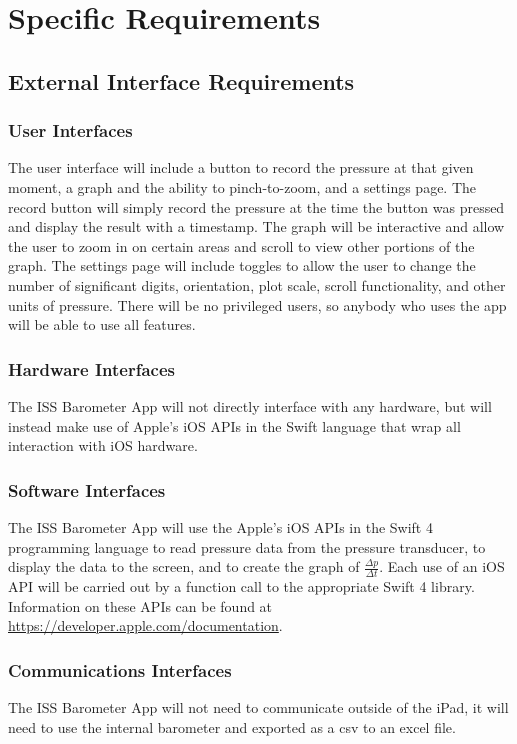 \documentclass[onecolumn, draftclsnofoot,10pt, compsoc]{IEEEtran}
\def \CapstoneProjectName{ISS Barometer App }
\begin{document}
\section{Specific Requirements}

\subsection{External Interface Requirements}

\subsubsection{User Interfaces}
The user interface will include a button to record the pressure at that given moment, a graph and the ability to pinch-to-zoom, and a settings page.
The record button will simply record the pressure at the time the button was pressed and display the result with a timestamp.
The graph will be interactive and allow the user to zoom in on certain areas and scroll to view other portions of the graph.
The settings page will include toggles to allow the user to change the number of significant digits, orientation, plot scale, scroll functionality, and other units of pressure.
There will be no privileged users, so anybody who uses the app will be able to use all features.

\subsubsection{Hardware Interfaces}
The \CapstoneProjectName will not directly interface with any hardware, but will instead make use of Apple's iOS APIs in the Swift language that wrap all interaction with iOS hardware.

\subsubsection{Software Interfaces}
The \CapstoneProjectName will use the Apple's iOS APIs in the Swift 4 programming language to read pressure data from the pressure transducer, to display the data to the screen, and to create the graph of $\frac{\Delta p}{\Delta t}$.
Each use of an iOS API will be carried out by a function call to the appropriate Swift 4 library. Information on these APIs can be found at \url{https://developer.apple.com/documentation}.

\subsubsection{Communications Interfaces}
The ISS Barometer App will not need to communicate outside of the iPad, it will need to use the internal barometer and exported as a csv to an excel file.
\end{document}
